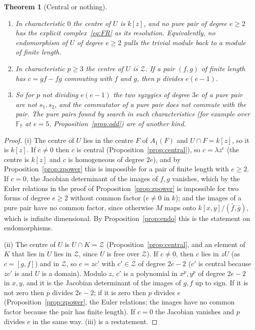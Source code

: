 \documentclass[11pt]{article}
\newtheorem{thmletter}{Theorem}
\theoremstyle{definition}
\theoremstyle{remark}
\newcommand{\F}{\mathbb{F}}
\begin{document}
\begin{thmletter}[Central or nothing]\label{thm:mech}
\begin{enumerate}
\item[(i)] In characteristic $0$ the centre of $U$ is $k[z]$, and no pure pair of degree $e\ge2$ has the explicit complex~\eqref{eq:FR} as its resolution. Equivalently, no endomorphism of $U$ of degree $e\ge2$ pulls the trivial module back to a module of finite length.
\item[(ii)] In characteristic $p\ge3$ the centre of $U$ is $\mathcal Z$. If a pair $(f,g)$ of finite length has $c=gf-fg$ commuting with $f$ and $g$, then $p$ divides $e(e-1)$.
\item[(iii)] So for $p$ not dividing $e(e-1)$ the two syzygies of degree $3e$ of a pure pair are not $s_1,s_2$, and the commutator of a pure pair does not commute with the pair. The pure pairs found by search in such characteristics (for example over $\F_7$ at $e=5$, Proposition~\ref{prop:odd}) are of another kind.
\end{enumerate}
\end{thmletter}
\begin{proof}
(i) The centre of $U$ lies in the centre $F$ of $A_1(F)$ and $U\cap F=k[z]$, so it is $k[z]$. If $c\ne0$ then $c$ is central (Proposition~\ref{prop:central}), so $c=\lambda z^e$ (the centre is $k[z]$ and $c$ is homogeneous of degree $2e$), and by Proposition~\ref{prop:zpower} this is impossible for a pair of finite length with $e\ge2$. If $c=0$, the Jacobian determinant of the images of $f,g$ vanishes, which by the Euler relations in the proof of Proposition~\ref{prop:zpower} is impossible for two forms of degree $e\ge2$ without common factor ($e\ne0$ in $k$); and the images of a pure pair have no common factor, since otherwise $M$ maps onto $k[x,y]/(\bar f,\bar g)$, which is infinite dimensional. By Proposition~\ref{prop:endo} this is the statement on endomorphisms.

(ii) The centre of $U$ is $U\cap K=\mathcal Z$ (Proposition~\ref{prop:central}, and an element of $K$ that lies in $U$ lies in $\mathcal Z$, since $U$ is free over $\mathcal Z$). If $c\ne0$, then $c$ lies in $zU$ (as $c=[g,f]$) and in $\mathcal Z$, so $c=zc'$ with $c'\in\mathcal Z$ of degree $2e-2$ ($c'$ is central because $zc'$ is and $U$ is a domain). Modulo $z$, $c'$ is a polynomial in $x^p,y^p$ of degree $2e-2$ in $x,y$, and it is the Jacobian determinant of the images of $g,f$ up to sign. If it is not zero then $p$ divides $2e-2$; if it is zero then $p$ divides $e$ (Proposition~\ref{prop:zpower}, the Euler relations; the images have no common factor because the pair has finite length). If $c=0$ the Jacobian vanishes and $p$ divides $e$ in the same way. (iii) is a restatement.
\end{proof}
\end{document}
